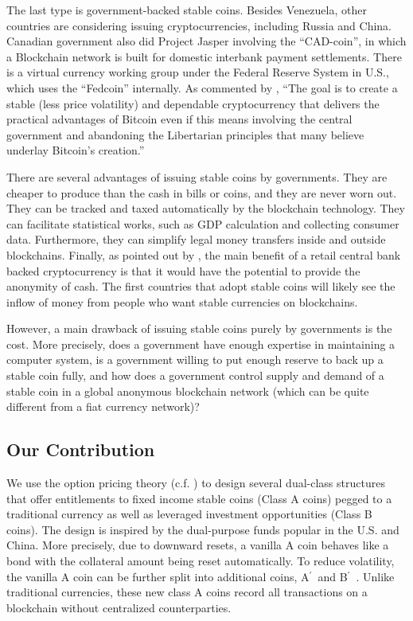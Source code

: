 \documentclass[11pt]{article}%
\numberwithin{equation}{section}
\theoremstyle{plain}
\newcommand{\Ap}{A\ensuremath{^\prime}~}
\newcommand{\Bp}{B\ensuremath{^\prime}~}
\begin{document}
The last type is government-backed stable coins. Besides Venezuela, other countries are considering issuing cryptocurrencies, including Russia and China. Canadian government also did Project Jasper involving the ``CAD-coin'', in which a Blockchain network is built for domestic interbank payment settlements. There is a virtual currency working group under the Federal Reserve System in U.S., which uses the ``Fedcoin'' internally. As commented by \cite{garratt_cad-coin_2016}, ``The goal is to create a stable (less price volatility) and dependable cryptocurrency that delivers the practical advantages of Bitcoin even if this means involving the central government and abandoning the Libertarian principles that many believe underlay Bitcoin's creation.''

There are several advantages of issuing stable coins by governments. They are cheaper to produce than the cash in bills or coins, and they are never worn out. They can be tracked and taxed automatically by the blockchain technology. They can facilitate statistical works, such as GDP calculation and collecting consumer data. Furthermore, they can simplify legal money transfers inside and outside blockchains. Finally, as pointed out by \cite{bech_central_2017}, the main benefit of a retail central bank backed cryptocurrency is that it would have the potential to provide the anonymity of cash. The first countries that adopt stable coins will likely see the inflow of money from people who want stable currencies on blockchains.

However, a main drawback of issuing stable coins purely by governments is the cost. More precisely, does a government have enough expertise in maintaining a computer system, is a government willing to put enough reserve to back up a stable coin fully, and  how does a government control supply and demand of a stable coin in a global anonymous blockchain network (which can be quite different from a fiat currency network)?



\subsection{Our Contribution}

We use the option pricing theory (c.f. \cite{duffie_dynamic_2010,hull_options_2017,ingersoll_theory_1987,jarrow_derivative_1999,shreve_stochastic_2004}) to design several dual-class structures that offer entitlements to fixed income stable coins (Class A coins) pegged to a traditional currency as well as leveraged investment opportunities (Class B coins).  The design is inspired by the dual-purpose funds popular in the U.S. and China. More precisely, due to downward resets, a vanilla A coin behaves like a bond with the collateral amount being reset automatically. To reduce volatility, the vanilla A coin can be further split into additional coins, \Ap and \Bp. Unlike traditional currencies, these new class A coins record all transactions on a blockchain without centralized counterparties.
\end{document}
